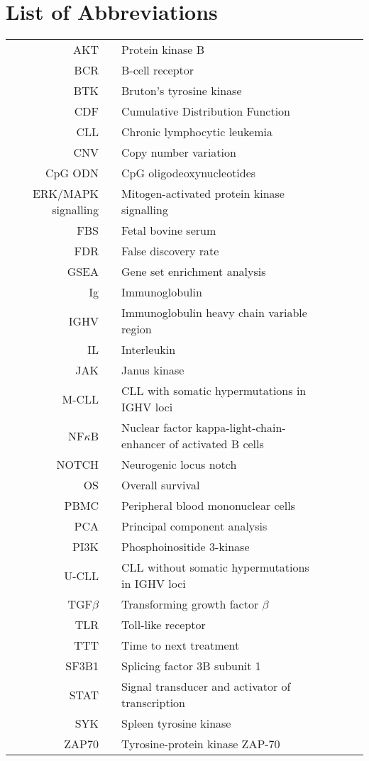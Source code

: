 \documentclass[11pt, a4paper, twosided]{book}
\begin{document}
\newpage
\tableofcontents
\clearpage

\newpage
\hypertarget{list-of-abbreviations}{%
\chapter*{List of Abbreviations}\label{list-of-abbreviations}}
\begin{tabular}{rp{0.2cm}lp{1cm}rp{0.2cm}l}
    AKT & & Protein kinase B \\
    BCR & & B-cell receptor \\
    BTK & & Bruton’s tyrosine kinase \\
    CDF & & Cumulative Distribution Function \\
    CLL & & Chronic lymphocytic leukemia \\
    CNV & & Copy number variation \\
    CpG ODN & & CpG oligodeoxynucleotides \\
    ERK/MAPK signalling & & Mitogen-activated protein kinase signalling \\
    FBS & & Fetal bovine serum \\
    FDR & & False discovery rate \\
    GSEA & & Gene set enrichment analysis  \\
    Ig & & Immunoglobulin \\
    IGHV & & Immunoglobulin heavy chain variable region \\
    IL & & Interleukin \\
    JAK & & Janus kinase \\
    M-CLL & & CLL with somatic hypermutations in IGHV loci \\
    NF$\kappa$B & & Nuclear factor kappa-light-chain-enhancer of activated B cells \\
    NOTCH & & Neurogenic locus notch  \\
    OS & & Overall survival \\
    PBMC & & Peripheral blood mononuclear cells \\
    PCA & & Principal component analysis \\
    PI3K & & Phosphoinositide 3-kinase \\
    U-CLL & & CLL without somatic hypermutations in IGHV loci \\
    TGF$\beta$ & & Transforming growth factor $\beta$ \\
    TLR & & Toll-like receptor \\ 
    TTT & & Time to next treatment \\
    SF3B1 & & Splicing factor 3B subunit 1 \\
    STAT & & Signal transducer and activator of transcription \\
    SYK & & Spleen tyrosine kinase \\
    ZAP70 & & Tyrosine-protein kinase ZAP-70 \\


\end{tabular}
\end{document}
